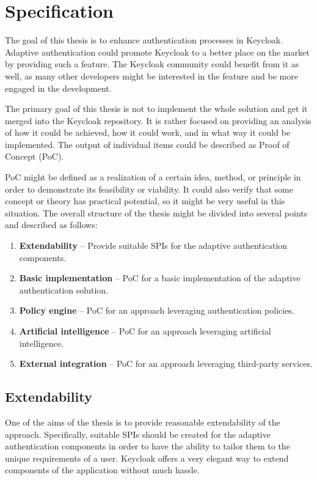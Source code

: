 \chapter{Specification} \label{specification}

The goal of this thesis is to enhance authentication processes in Keycloak.
Adaptive authentication could promote Keycloak to a better place on the market by providing such a feature. 
The Keycloak community could benefit from it as well, as many other developers might be interested in the feature and be more engaged in the development.

The primary goal of this thesis is not to implement the whole solution and get it merged into the Keycloak repository.
It is rather focused on providing an analysis of how it could be achieved, how it could work, and in what way it could be implemented.
The output of individual items could be described as Proof of Concept (PoC).

PoC might be defined as a realization of a certain idea, method, or principle in order to demonstrate its feasibility or viability.
It could also verify that some concept or theory has practical potential, so it might be very useful in this situation.\cite{spec-poc} 
\newline
\newline
The overall structure of the thesis might be divided into several points and described as follows:
\begin{enumerate}
    \item \textbf{Extendability} -- Provide suitable SPIs for the adaptive authentication components.
    \item \textbf{Basic implementation} -- PoC for a basic implementation of the adaptive authentication solution.
    \item \textbf{Policy engine} -- PoC for an approach leveraging authentication policies.
    \item \textbf{Artificial intelligence} -- PoC for an approach leveraging artificial intelligence. 
    \item \textbf{External integration} -- PoC for an approach leveraging third-party services.
\end{enumerate}

\newpage

\section{Extendability}
One of the aims of the thesis is to provide reasonable extendability of the approach.
Specifically, suitable SPIs should be created for the adaptive authentication components in order to have the ability to tailor them to the unique requirements of a user.
Keycloak offers a very elegant way to extend components of the application without much hassle.

